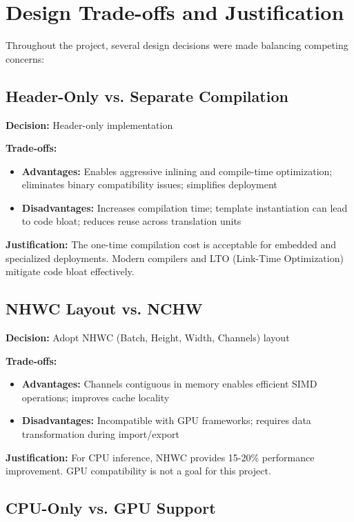\documentclass[12pt,oneside,a4paper]{report}
\begin{document}
\section{Design Trade-offs and Justification}

Throughout the project, several design decisions were made balancing competing concerns:

\subsection{Header-Only vs. Separate Compilation}

\textbf{Decision:} Header-only implementation

\textbf{Trade-offs:}
\begin{itemize}
    \item \textbf{Advantages:} Enables aggressive inlining and compile-time optimization; eliminates binary compatibility issues; simplifies deployment
    \item \textbf{Disadvantages:} Increases compilation time; template instantiation can lead to code bloat; reduces reuse across translation units
\end{itemize}

\textbf{Justification:} The one-time compilation cost is acceptable for embedded and specialized deployments. Modern compilers and LTO (Link-Time Optimization) mitigate code bloat effectively.

\subsection{NHWC Layout vs. NCHW}

\textbf{Decision:} Adopt NHWC (Batch, Height, Width, Channels) layout

\textbf{Trade-offs:}
\begin{itemize}
    \item \textbf{Advantages:} Channels contiguous in memory enables efficient SIMD operations; improves cache locality
    \item \textbf{Disadvantages:} Incompatible with GPU frameworks; requires data transformation during import/export
\end{itemize}

\textbf{Justification:} For CPU inference, NHWC provides 15-20\% performance improvement. GPU compatibility is not a goal for this project.

\subsection{CPU-Only vs. GPU Support}
\end{document}
